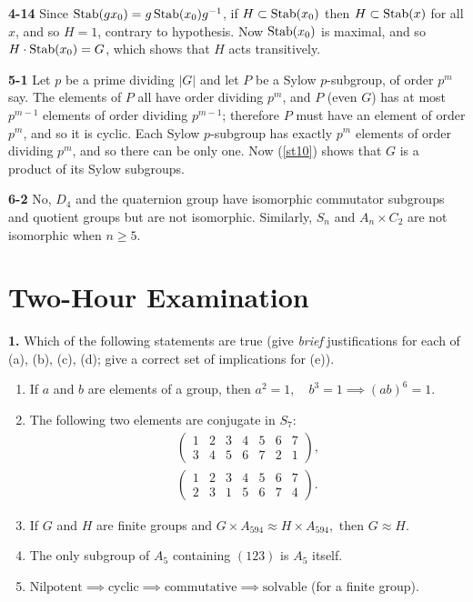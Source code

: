 \documentclass[a4paper,11pt,final]{memoir}%
\theoremstyle{nonumberplain}
\begin{document}
\bigskip\noindent\textbf{4-14}
Since $\operatorname{Stab}(gx_{0})=g\operatorname{Stab}(x_{0})g^{-1}$, if $H\subset\operatorname{Stab}(x_{0})$ then
$H\subset\operatorname{Stab}(x)$ for all $x$, and so $H=1$, contrary to hypothesis. Now
$\operatorname{Stab}(x_{0})$ is maximal, and so $H\cdot\operatorname{Stab}(x_{0})=G$, which shows that $H$
acts transitively.

\bigskip\noindent\textbf{5-1}
Let $p$ be a prime dividing $|G|$ and let $P$ be a Sylow $p$-subgroup, of
order $p^{m}$ say. The elements of $P$ all have order dividing $p^{m}$, and $P$
(even $G$) has at most $p^{m-1}$ elements of order dividing $p^{m-1}$; therefore $P$ must have an element of
order $p^{m}$, and so it is cyclic. Each Sylow $p$-subgroup has exactly
$p^{m}$ elements of order dividing $p^{m}$, and so there can be only one. Now
(\ref{st10}) shows that $G$ is a product of its Sylow subgroups.

\bigskip\noindent\textbf{6-2}
No, $D_{4}$ and the quaternion group have isomorphic commutator subgroups and
quotient groups but are not isomorphic. Similarly, $S_{n}$ and $A_{n}\times
C_{2}$ are not isomorphic when $n\geq5$.



\clearpage


\clearpage


\chapter{Two-Hour Examination}

\noindent\textbf{1.} Which of the following statements are true (give
\textit{brief} justifications for each of (a), (b), (c), (d); give a correct
set of implications for (e)).

\begin{enumerate}
\item If $a$ and $b$ are elements of a group, then $a^{2}=1,\quad
b^{3}=1\implies(ab)^{6}=1$.

\item The following two elements are conjugate in $S_{7}$:
\begin{align*}%
\begin{pmatrix}
1 & 2 & 3 & 4 & 5 & 6 & 7\\
3 & 4 & 5 & 6 & 7 & 2 & 1
\end{pmatrix}
,\\%
\begin{pmatrix}
1 & 2 & 3 & 4 & 5 & 6 & 7\\
2 & 3 & 1 & 5 & 6 & 7 & 4
\end{pmatrix}
.
\end{align*}


\item If $G$ and $H$ are finite groups and $G\times A_{594}\approx H\times
A_{594},$ then $G\approx H$.

\item The only subgroup of $A_{5}$ containing $(123)$ is $A_{5}$ itself.

\item $\text{Nilpotent}\implies\text{cyclic}\implies\text{commutative}%
\implies\text{solvable}$ (for a finite group).
\end{enumerate}
\end{document}
